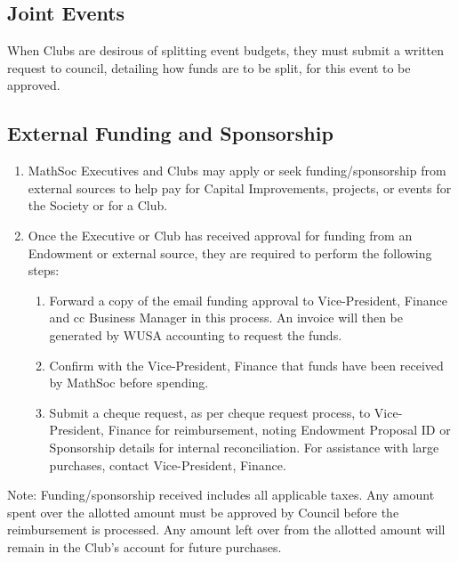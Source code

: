 \subsection{Joint Events}
When Clubs are desirous of splitting event budgets, they must submit a written request to council, detailing how funds are to be split, for this event to be approved.

\subsection{External Funding and Sponsorship}
\begin{enumerate}
    \item MathSoc Executives and Clubs may apply or seek funding/sponsorship from external sources to help pay for Capital Improvements, projects, or events for the Society or for a Club.
    \item Once the Executive or Club has received approval for funding from an Endowment or external source, they are required to perform the following steps:
    \begin{enumerate}
        \item Forward a copy of the email funding approval to Vice-President, Finance and cc Business Manager in this process. An invoice will then be generated by WUSA accounting to request the funds.
        \item Confirm with the Vice-President, Finance that funds have been received by MathSoc before spending. 
        \item Submit a cheque request, as per cheque request process, to Vice-President, Finance for reimbursement, noting Endowment Proposal ID or Sponsorship details for internal reconciliation. For assistance with large purchases, contact Vice-President, Finance.
    \end{enumerate}
\end{enumerate}
Note: Funding/sponsorship received includes all applicable taxes. Any amount spent over the allotted amount must be approved by Council before the reimbursement is processed. Any amount left over from the allotted amount will remain in the Club's account for future purchases.
